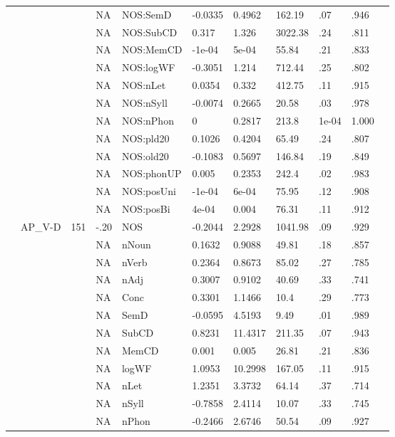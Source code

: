 \begin{table}[ht]
\begin{tabular}{lllllllllll}
   &  &  & NA & NOS:SemD & -0.0335 & 0.4962 & 162.19 & .07 & .946 &   \\ 
   &  &  & NA & NOS:SubCD & 0.317 & 1.326 & 3022.38 & .24 & .811 &   \\ 
   &  &  & NA & NOS:MemCD & -1e-04 & 5e-04 & 55.84 & .21 & .833 &   \\ 
   &  &  & NA & NOS:logWF & -0.3051 & 1.214 & 712.44 & .25 & .802 &   \\ 
   &  &  & NA & NOS:nLet & 0.0354 & 0.332 & 412.75 & .11 & .915 &   \\ 
   &  &  & NA & NOS:nSyll & -0.0074 & 0.2665 & 20.58 & .03 & .978 &   \\ 
   &  &  & NA & NOS:nPhon & 0 & 0.2817 & 213.8 & 1e-04 & 1.000 &   \\ 
   &  &  & NA & NOS:pld20 & 0.1026 & 0.4204 & 65.49 & .24 & .807 &   \\ 
   &  &  & NA & NOS:old20 & -0.1083 & 0.5697 & 146.84 & .19 & .849 &   \\ 
   &  &  & NA & NOS:phonUP & 0.005 & 0.2353 & 242.4 & .02 & .983 &   \\ 
   &  &  & NA & NOS:posUni & -1e-04 & 6e-04 & 75.95 & .12 & .908 &   \\ 
   &  &  & NA & NOS:posBi & 4e-04 & 0.004 & 76.31 & .11 & .912 &   \\ 
   & AP\_V-D & 151 & -.20 & NOS & -0.2044 & 2.2928 & 1041.98 & .09 & .929 &   \\ 
   &  &  & NA & nNoun & 0.1632 & 0.9088 & 49.81 & .18 & .857 &   \\ 
   &  &  & NA & nVerb & 0.2364 & 0.8673 & 85.02 & .27 & .785 &   \\ 
   &  &  & NA & nAdj & 0.3007 & 0.9102 & 40.69 & .33 & .741 &   \\ 
   &  &  & NA & Conc & 0.3301 & 1.1466 & 10.4 & .29 & .773 &   \\ 
   &  &  & NA & SemD & -0.0595 & 4.5193 & 9.49 & .01 & .989 &   \\ 
   &  &  & NA & SubCD & 0.8231 & 11.4317 & 211.35 & .07 & .943 &   \\ 
   &  &  & NA & MemCD & 0.001 & 0.005 & 26.81 & .21 & .836 &   \\ 
   &  &  & NA & logWF & 1.0953 & 10.2998 & 167.05 & .11 & .915 &   \\ 
   &  &  & NA & nLet & 1.2351 & 3.3732 & 64.14 & .37 & .714 &   \\ 
   &  &  & NA & nSyll & -0.7858 & 2.4114 & 10.07 & .33 & .745 &   \\ 
   &  &  & NA & nPhon & -0.2466 & 2.6746 & 50.54 & .09 & .927 &   \\ 

\end{tabular}
\end{table}
